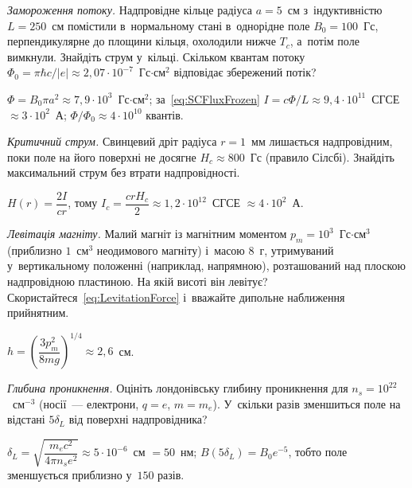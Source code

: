 \begin{problem}\label{prb:FrozenFlux}
	\emph{Замороження потоку.} Надпровідне кільце радіуса $a=5$~см з~індуктивністю
	$L=250$~см помістили в~нормальному стані в~однорідне поле $B_0=100$~Гс,
	перпендикулярне до площини кільця, охолодили нижче $T_c$, а~потім поле вимкнули.
	Знайдіть струм у~кільці. Скільком квантам потоку $\Phi_0=\pi\hbar
		c/|e|\approx2{,}07\cdot10^{-7}$~Гс$\cdot$см$^2$ відповідає збережений потік?
	\begin{solution}
		$\Phi=B_0\pi a^2\approx7{,}9\cdot10^{3}$~Гс$\cdot$см$^2$;
		за~\eqref{eq:SCFluxFrozen} $I=c\Phi/L\approx9{,}4\cdot10^{11}$~СГСЕ
		$\approx3\cdot10^{2}$~А; $\Phi/\Phi_0\approx4\cdot10^{10}$ квантів.
	\end{solution}
\end{problem}

\begin{problem}\label{prb:SilsbeeCurrent}
	\emph{Критичний струм.} Свинцевий дріт радіуса $r=1$~мм лишається надпровідним, поки
	поле на його поверхні не досягне $H_c\approx800$~Гс (правило Сілсбі). Знайдіть
	максимальний струм без втрати надпровідності.
	\begin{solution}
		$H(r)=\dfrac{2I}{cr}$, тому $I_c=\dfrac{crH_c}{2}\approx1{,}2\cdot10^{12}$~СГСЕ
		$\approx4\cdot10^{2}$~А.
	\end{solution}
\end{problem}

\begin{problem}\label{prb:MagnetLevitation}
	\emph{Левітація магніту.} Малий магніт із магнітним моментом
	$p_m=10^{3}$~Гс$\cdot$см$^3$ (приблизно $1$~см$^3$ неодимового магніту) і~масою $8$~г,
	утримуваний у~вертикальному положенні (наприклад, напрямною), розташований над плоскою
	надпровідною пластиною. На якій висоті він левітує? Скористайтеся~\eqref{eq:LevitationForce} і~вважайте дипольне
	наближення прийнятним.
	\begin{solution}
		$h=\left(\dfrac{3p_m^2}{8mg}\right)^{1/4}\approx2{,}6$~см.
	\end{solution}
\end{problem}

\begin{problem}\label{prb:LondonDepth}
	\emph{Глибина проникнення.} Оцініть лондонівську глибину проникнення для
	$n_s=10^{22}$~см$^{-3}$ (носії~--- електрони, $q=e$, $m=m_e$). У~скільки разів
	зменшиться поле на відстані $5\delta_L$ від поверхні надпровідника?
	\begin{solution}
		$\delta_L=\sqrt{\dfrac{m_ec^2}{4\pi n_se^2}}\approx5\cdot10^{-6}$~см $=50$~нм;
		$B(5\delta_L)=B_0e^{-5}$, тобто поле зменшується приблизно у~$150$ разів.
	\end{solution}
\end{problem}

